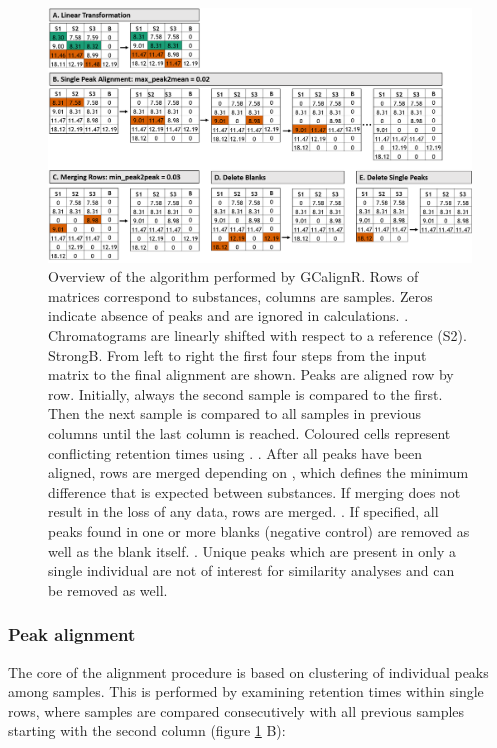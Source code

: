 \begin{figure}[htbp]
  \centering
  \includegraphics[width=13cm]{figures/algorithm}
  \caption{Overview of the algorithm performed by GCalignR. Rows of matrices correspond to substances, columns are samples. Zeros indicate absence of peaks and are ignored in calculations. . Chromatograms are linearly shifted with respect to a reference (S2). Strong{B}. From left to right the first four steps from the input matrix to the final alignment are shown. Peaks are aligned row by row. Initially, always the second sample is compared to the first. Then the next sample is compared to all samples in previous columns until the last column is reached. Coloured cells represent conflicting retention times using . . After all peaks have been aligned, rows are merged depending on , which defines the minimum difference that is expected between substances. If merging does not result in the loss of any data, rows are merged. . If specified, all peaks found in one or more blanks (negative control) are removed as well as the blank itself. . Unique peaks which are present in only a single individual are not of interest for similarity analyses and can be removed as well.}
  \label{figure:algorithm}
\end{figure}

\subsubsection{Peak alignment}

The core of the alignment procedure is based on clustering of individual
peaks among samples. This is performed by examining retention times
within single rows, where samples are compared consecutively with all
previous samples starting with the second column (figure
\ref{figure:algorithm} B):\par

